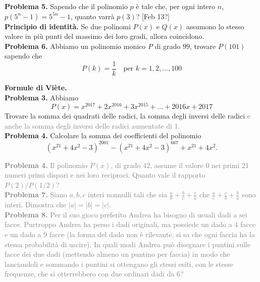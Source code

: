 \documentclass[a4paper]{article}
\theoremstyle{remark}
\theoremstyle{definition}
\begin{document}
\begin{multicols}{2}
	\textbf{Problema 5.} Sapendo che il polinomio $ p $ è tale che, per ogni intero $ n $, $ p(5^n - 1) = 5^{5n} - 1 $, quanto varrà $ p(3) $? [Feb 13?] \\
	
	\textbf{Principio di identità.} Se due polinomi $ P(x) $ e $ Q(x) $ assumono lo stesso valore in più punti del massimo dei loro gradi, allora coincidono. \\
	
	\textbf{Problema 6.} Abbiamo un polinomio monico $ P $ di grado $ 99 $, trovare $ P(101) $ sapendo che
	\[ P(k) = \frac{1}{k} \quad \text{per } k = 1, 2, \dots, 100 \]
	
	\textbf{Formule di Viète.} \\
	
	\textbf{Problema 3.} Abbiamo
	\[ P(x) = x^{2017} + 2x^{2016} +3x^{2015} + \dots + 2016x + 2017 \]
	Trovare la somma dei quadrati delle radici, la somma degli inversi delle radici \textcolor{gray}{e anche la somma degli inversi delle radici aumentate di 1.} \\
	
	\textbf{Problema 4.} Calcolare la somma dei coefficienti del polinomio
	\[ (x^{21} + 4x^2 - 3)^{2001} - (x^{21} + 4x^2 - 3)^{667} +x^{21} +4x^2. \]
	
	\textcolor{gray}{\textbf{Problema 4.} Il polinomio $ P(x) $, di grado 42, assume il valore 0 nei primi 21 numeri primi dispari e nei loro reciproci. Quanto vale il rapporto $ P(2)/P(1/2) $?}\\
	
	
	\textcolor{gray}{\textbf{Problema 7.} Siano $ a, b, c $ interi nonnulli tali che sia $ \frac{a}{b} +\frac{b}{c}+ \frac{c}{a} $ che $ \frac{a}{c} +\frac{c}{b}+ \frac{b}{a} $ sono interi. Dimostra che $ |a| = |b| = |c| $.} \\
	
	\textcolor{gray}{\textbf{Problema 8.} Per il suo gioco preferito Andrea ha bisogno di usuali dadi a sei facce. Purtroppo Andrea ha perso i dadi originali, ma possiede un dado a 4 facce e un dado a 9 facce (la forma del dado non è rilevante, si sa che ogni faccia ha la stessa probabilità di uscire). In quali modi Andrea può disegnare i puntini sulle facce dei due dadi (mettendo almeno un puntino per faccia) in modo che lanciandoli e sommando i puntini si ottengano gli stessi esiti, con le stesse frequenze, che si otterrebbero con due ordinari dadi da 6?}
	
\end{multicols}
\end{document}
